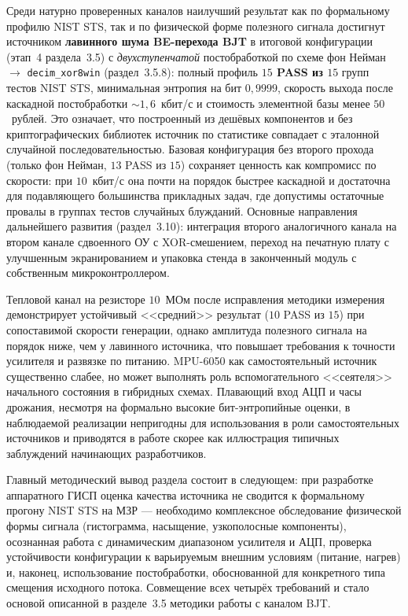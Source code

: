 Среди натурно проверенных каналов наилучший результат как по формальному профилю
NIST STS, так и по физической форме полезного сигнала достигнут источником
\textbf{лавинного шума BE-перехода BJT} в итоговой конфигурации (этап~4
раздела~3.5) с \emph{двухступенчатой} постобработкой по схеме фон Нейман $\to$
\texttt{decim\_xor8win} (раздел~3.5.8): полный профиль \textbf{$15$ PASS из $15$}
групп тестов NIST STS, минимальная энтропия на бит $0{,}9999$, скорость выхода
после каскадной постобработки $\sim 1{,}6$~кбит/с и стоимость элементной базы
менее $50$~рублей. Это означает, что построенный из дешёвых компонентов и без
криптографических библиотек источник по статистике совпадает с эталонной случайной
последовательностью. Базовая конфигурация без второго прохода (только фон Нейман,
$13$ PASS из $15$) сохраняет ценность как компромисс по скорости: при $10$~кбит/с
она почти на порядок быстрее каскадной и достаточна для подавляющего большинства
прикладных задач, где допустимы остаточные провалы в группах тестов случайных
блужданий. Основные направления дальнейшего развития (раздел~3.10): интеграция
второго аналогичного канала на втором канале сдвоенного ОУ с XOR-смешением,
переход на печатную плату с улучшенным экранированием и упаковка стенда в
законченный модуль с собственным микроконтроллером.

Тепловой канал на резисторе $10$~МОм после исправления методики измерения
демонстрирует устойчивый <<средний>> результат ($10$ PASS из $15$) при сопоставимой
скорости генерации, однако амплитуда полезного сигнала на порядок ниже, чем у
лавинного источника, что повышает требования к точности усилителя и развязке
по питанию. MPU-6050 как самостоятельный источник существенно слабее, но
может выполнять роль вспомогательного <<сеятеля>> начального состояния в гибридных
схемах. Плавающий вход АЦП и часы дрожания, несмотря на формально высокие
бит-энтропийные оценки, в наблюдаемой реализации непригодны для использования
в роли самостоятельных источников и приводятся в работе скорее как иллюстрация
типичных заблуждений начинающих разработчиков.

Главный методический вывод раздела состоит в следующем: при разработке
аппаратного ГИСП оценка качества источника не сводится к формальному прогону
NIST STS на МЗР --- необходимо комплексное обследование физической формы сигнала
(гистограмма, насыщение, узкополосные компоненты), осознанная работа с
динамическим диапазоном усилителя и АЦП, проверка устойчивости конфигурации к
варьируемым внешним условиям (питание, нагрев) и, наконец, использование
постобработки, обоснованной для конкретного типа смещения исходного потока.
Совмещение всех четырёх требований и стало основой описанной в разделе~3.5
методики работы с каналом BJT.

